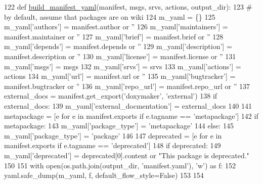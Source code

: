 \begin{DoxyCode}
122 \textcolor{keyword}{def }\hyperlink{namespacerosdoc__lite_afe958f791ef5c66777c758593e3151cd}{build\_manifest\_yaml}(manifest, msgs, srvs, actions, output\_dir):
123     \textcolor{comment}{# by default, assume that packages are on wiki}
124     m\_yaml = \{\}
125     m\_yaml[\textcolor{stringliteral}{'authors'}] = manifest.author \textcolor{keywordflow}{or} \textcolor{stringliteral}{''}
126     m\_yaml[\textcolor{stringliteral}{'maintainers'}] = manifest.maintainer \textcolor{keywordflow}{or} \textcolor{stringliteral}{''}
127     m\_yaml[\textcolor{stringliteral}{'brief'}] = manifest.brief \textcolor{keywordflow}{or} \textcolor{stringliteral}{''}
128     m\_yaml[\textcolor{stringliteral}{'depends'}] = manifest.depends \textcolor{keywordflow}{or} \textcolor{stringliteral}{''}
129     m\_yaml[\textcolor{stringliteral}{'description'}] = manifest.description \textcolor{keywordflow}{or} \textcolor{stringliteral}{''}
130     m\_yaml[\textcolor{stringliteral}{'license'}] = manifest.license \textcolor{keywordflow}{or} \textcolor{stringliteral}{''}
131     m\_yaml[\textcolor{stringliteral}{'msgs'}] = msgs
132     m\_yaml[\textcolor{stringliteral}{'srvs'}] = srvs
133     m\_yaml[\textcolor{stringliteral}{'actions'}] = actions
134     m\_yaml[\textcolor{stringliteral}{'url'}] = manifest.url \textcolor{keywordflow}{or} \textcolor{stringliteral}{''}
135     m\_yaml[\textcolor{stringliteral}{'bugtracker'}] = manifest.bugtracker \textcolor{keywordflow}{or} \textcolor{stringliteral}{''}
136     m\_yaml[\textcolor{stringliteral}{'repo\_url'}] = manifest.repo\_url \textcolor{keywordflow}{or} \textcolor{stringliteral}{''}
137     external\_docs = manifest.get\_export(\textcolor{stringliteral}{'doxymaker'}, \textcolor{stringliteral}{'external'})
138     \textcolor{keywordflow}{if} external\_docs:
139         m\_yaml[\textcolor{stringliteral}{'external\_docmentation'}] = external\_docs
140 
141     metapackage = [e \textcolor{keywordflow}{for} e \textcolor{keywordflow}{in} manifest.exports \textcolor{keywordflow}{if} e.tagname == \textcolor{stringliteral}{'metapackage'}]
142     \textcolor{keywordflow}{if} metapackage:
143         m\_yaml[\textcolor{stringliteral}{'package\_type'}] = \textcolor{stringliteral}{'metapackage'}
144     \textcolor{keywordflow}{else}:
145         m\_yaml[\textcolor{stringliteral}{'package\_type'}] = \textcolor{stringliteral}{'package'}
146 
147     deprecated = [e \textcolor{keywordflow}{for} e \textcolor{keywordflow}{in} manifest.exports \textcolor{keywordflow}{if} e.tagname == \textcolor{stringliteral}{'deprecated'}]
148     \textcolor{keywordflow}{if} deprecated:
149         m\_yaml[\textcolor{stringliteral}{'deprecated'}] = deprecated[0].content \textcolor{keywordflow}{or} \textcolor{stringliteral}{"This package is deprecated."}
150 
151     with open(os.path.join(output\_dir, \textcolor{stringliteral}{'manifest.yaml'}), \textcolor{stringliteral}{'w'}) \textcolor{keyword}{as} f:
152         yaml.safe\_dump(m\_yaml, f, default\_flow\_style=\textcolor{keyword}{False})
153 
154 
\end{DoxyCode}


